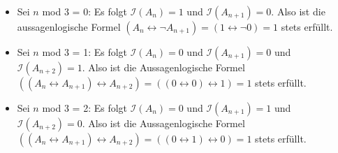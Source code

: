 \documentclass[a4paper,10pt]{article}
\begin{document}
\begin{compactenum}[(a)]
		\begin{itemize}
			\item Sei $n$ mod 3 = 0: Es folgt $ \mathcal{I}(A_n)=1 $ und $ \mathcal{I}(A_{n+1})=0 $. Also ist die aussagenlogische Formel $(A_n \leftrightarrow \lnot A_{n+1}) = (1 \leftrightarrow \lnot 0) = 1$ stets erfüllt.
			\item Sei $n$ mod 3 = 1: Es folgt $ \mathcal{I}(A_n)=0 $ und $ \mathcal{I}(A_{n+1})=0 $ und $ \mathcal{I}(A_{n+2})=1 $. Also ist die Aussagenlogische Formel $ ((A_n \leftrightarrow A_{n+1}) \leftrightarrow A_{n+2}) = ((0 \leftrightarrow 0) \leftrightarrow 1) = 1 $ stets erfüllt.
			\item Sei $n$ mod 3 = 2: Es folgt $ \mathcal{I}(A_n)=0 $ und $ \mathcal{I}(A_{n+1})=1 $ und $ \mathcal{I}(A_{n+2})=0 $. Also ist die Aussagenlogische Formel $ ((A_n \leftrightarrow A_{n+1}) \leftrightarrow A_{n+2}) = ((0 \leftrightarrow 1) \leftrightarrow 0) = 1 $ stets erfüllt.
		\end{itemize}
	\end{compactenum}\
\end{document}
